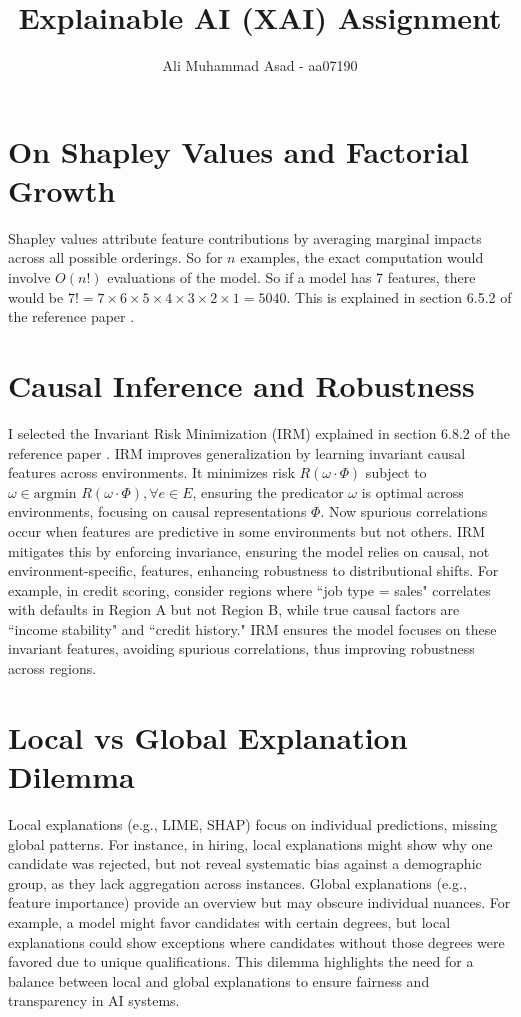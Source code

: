 \documentclass{article}
\title{Explainable AI (XAI) Assignment}
\author{Ali Muhammad Asad - aa07190}
\date{}
\theoremstyle{mytheoremstyle}
\theoremstyle{mytheoremstyle}
\theoremstyle{myproblemstyle}
\begin{document}
\maketitle


\section{On Shapley Values and Factorial Growth}
Shapley values attribute feature contributions by averaging marginal impacts across all possible orderings. So for $n$ examples, the exact computation would involve $O(n!)$ evaluations of the model. So if a model has 7 features, there would be $ 7! = 7 \times 6 \times 5 \times 4 \times 3 \times 2 \times 1 = 5040$. This is explained in section 6.5.2 of the reference paper \cite{refpaper}.

\section{Causal Inference and Robustness}
I selected the Invariant Risk Minimization (IRM) explained in section 6.8.2 of the reference paper \cite{refpaper}. IRM improves generalization by learning invariant causal features across environments. It minimizes risk $ R(\omega \cdot \Phi) $ subject to $ \omega \in \text{argmin }R(\omega \cdot \Phi), \forall e \in E $, ensuring the predicator $\omega$ is optimal across environments, focusing on causal representations $\Phi$. Now spurious correlations occur when features are predictive in some environments but not others. IRM mitigates this by enforcing invariance, ensuring the model relies on causal, not environment-specific, features, enhancing robustness to distributional shifts. For example, in credit scoring, consider regions where ``job type = sales" correlates with defaults in Region A but not Region B, while true causal factors are ``income stability" and ``credit history." IRM ensures the model focuses on these invariant features, avoiding spurious correlations, thus improving robustness across regions.

\section{Local vs Global Explanation Dilemma}
Local explanations (e.g., LIME, SHAP) focus on individual predictions, missing global patterns. For instance, in hiring, local explanations might show why one candidate was rejected, but not reveal systematic bias against a demographic group, as they lack aggregation across instances. Global explanations (e.g., feature importance) provide an overview but may obscure individual nuances. For example, a model might favor candidates with certain degrees, but local explanations could show exceptions where candidates without those degrees were favored due to unique qualifications. This dilemma highlights the need for a balance between local and global explanations to ensure fairness and transparency in AI systems.
\end{document}
